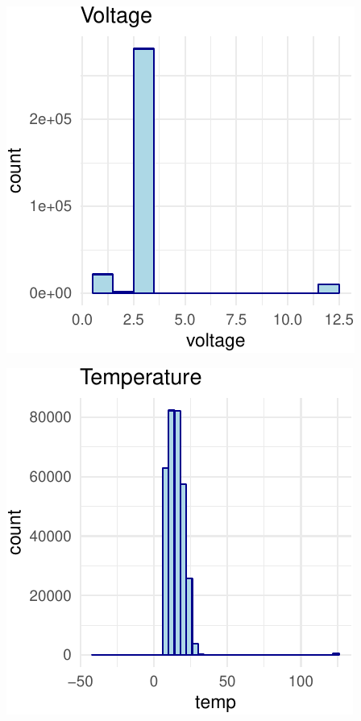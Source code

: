 \documentclass[]{article}
\begin{document}
\begin{center}\includegraphics{Project1WriteUp_files/figure-latex/unnamed-chunk-9-1} \end{center}

\begin{center}\includegraphics{Project1WriteUp_files/figure-latex/unnamed-chunk-9-2} \end{center}
\end{document}
